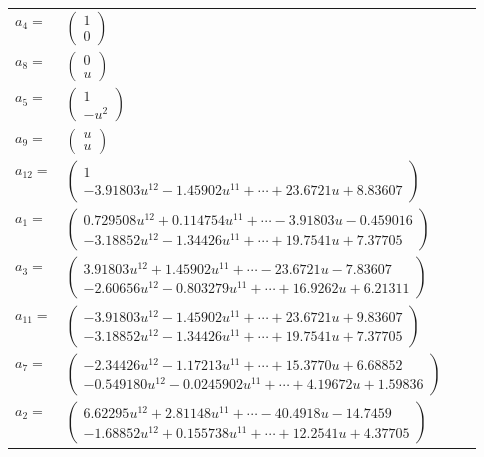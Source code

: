 \documentclass[1p]{elsarticle_modified}
\theoremstyle{definition}
\begin{document}
\begin{tabular}{m{7pt} m{180pt} m{7pt} m{180pt} }
\flushright $a_{4}=$&$\begin{pmatrix}1\\0\end{pmatrix}$ \\
\flushright $a_{8}=$&$\begin{pmatrix}0\\u\end{pmatrix}$ \\
\flushright $a_{5}=$&$\begin{pmatrix}1\\- u^2\end{pmatrix}$ \\
\flushright $a_{9}=$&$\begin{pmatrix}u\\u\end{pmatrix}$ \\
\flushright $a_{12}=$&$\begin{pmatrix}1\\-3.91803 u^{12}-1.45902 u^{11}+\cdots+23.6721 u+8.83607\end{pmatrix}$ \\
\flushright $a_{1}=$&$\begin{pmatrix}0.729508 u^{12}+0.114754 u^{11}+\cdots-3.91803 u-0.459016\\-3.18852 u^{12}-1.34426 u^{11}+\cdots+19.7541 u+7.37705\end{pmatrix}$ \\
\flushright $a_{3}=$&$\begin{pmatrix}3.91803 u^{12}+1.45902 u^{11}+\cdots-23.6721 u-7.83607\\-2.60656 u^{12}-0.803279 u^{11}+\cdots+16.9262 u+6.21311\end{pmatrix}$ \\
\flushright $a_{11}=$&$\begin{pmatrix}-3.91803 u^{12}-1.45902 u^{11}+\cdots+23.6721 u+9.83607\\-3.18852 u^{12}-1.34426 u^{11}+\cdots+19.7541 u+7.37705\end{pmatrix}$ \\
\flushright $a_{7}=$&$\begin{pmatrix}-2.34426 u^{12}-1.17213 u^{11}+\cdots+15.3770 u+6.68852\\-0.549180 u^{12}-0.0245902 u^{11}+\cdots+4.19672 u+1.59836\end{pmatrix}$ \\
\flushright $a_{2}=$&$\begin{pmatrix}6.62295 u^{12}+2.81148 u^{11}+\cdots-40.4918 u-14.7459\\-1.68852 u^{12}+0.155738 u^{11}+\cdots+12.2541 u+4.37705\end{pmatrix}$ \\

\end{tabular}
\end{document}
